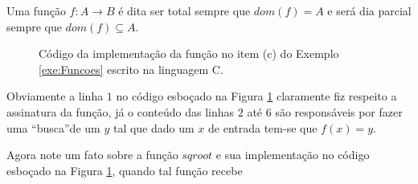 \begin{definition}
	Uma função $f: A \rightarrow B$ é dita ser total sempre que $dom(f) = A$ e será dia parcial sempre que $dom(f) \subseteq A$.
\end{definition}


\begin{figure}[h]
	
	\caption{Código da implementação da função no item (c) do Exemplo \ref{exe:Funcoes} escrito na linguagem C.}
	\label{fig:FuncaoSqrt}
\end{figure}

\begin{remark}
	Obviamente a linha $1$ no código esboçado na Figura \ref{fig:FuncaoSqrt} claramente fiz respeito a assinatura da função, já o conteúdo das linhas $2$ até $6$ são responsáveis por fazer uma ``busca''de um $y$ tal que dado um $x$ de entrada tem-se que $f(x) = y$.
\end{remark}

Agora note um fato sobre a função $sqroot$ e sua implementação no código esboçado na Figura \ref{fig:FuncaoSqrt}, quando tal função recebe 


